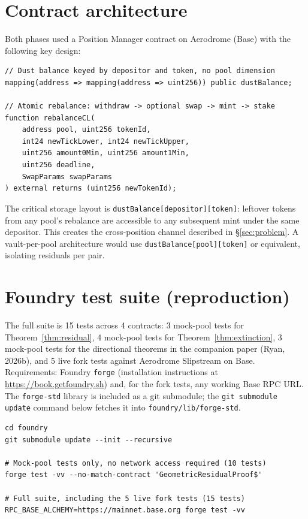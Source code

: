 \documentclass[11pt,a4paper]{article}
\begin{document}
\appendix
\newpage

\section{Contract architecture}\label{app:contract}

Both phases used a Position Manager contract on Aerodrome (Base) with the following key design:

\begin{verbatim}
// Dust balance keyed by depositor and token, no pool dimension
mapping(address => mapping(address => uint256)) public dustBalance;

// Atomic rebalance: withdraw -> optional swap -> mint -> stake
function rebalanceCL(
    address pool, uint256 tokenId,
    int24 newTickLower, int24 newTickUpper,
    uint256 amount0Min, uint256 amount1Min,
    uint256 deadline,
    SwapParams swapParams
) external returns (uint256 newTokenId);
\end{verbatim}

The critical storage layout is \texttt{dustBalance[depositor][token]}: leftover tokens from any pool's rebalance are accessible to any subsequent mint under the same depositor. This creates the cross-position channel described in \S\ref{sec:problem}. A vault-per-pool architecture would use \texttt{dustBalance\allowbreak{}[pool][token]} or equivalent, isolating residuals per pair.

\section{Foundry test suite (reproduction)}\label{app:foundry}

The full suite is 15 tests across 4 contracts: 3 mock-pool tests for Theorem~\ref{thm:residual}, 4 mock-pool tests for Theorem~\ref{thm:extinction}, 3 mock-pool tests for the directional theorems in the companion paper (Ryan, 2026b), and 5 live fork tests against Aerodrome Slipstream on Base. Requirements: Foundry \texttt{forge} (installation instructions at \url{https://book.getfoundry.sh}) and, for the fork tests, any working Base RPC URL. The \texttt{forge-std} library is included as a git submodule; the \texttt{git submodule update} command below fetches it into \texttt{foundry/lib/forge-std}.

\begin{verbatim}
cd foundry
git submodule update --init --recursive

# Mock-pool tests only, no network access required (10 tests)
forge test -vv --no-match-contract 'GeometricResidualProof$'

# Full suite, including the 5 live fork tests (15 tests)
RPC_BASE_ALCHEMY=https://mainnet.base.org forge test -vv
\end{verbatim}
\end{document}
